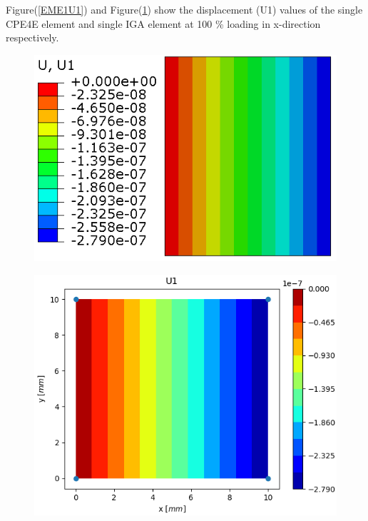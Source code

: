 \documentclass[11pt]{article}
\begin{document}
Figure(\ref{EME1U1}) and Figure(\ref{EME1U1_IGA}) show the displacement (U1) values of the single CPE4E element and single IGA element at 100 \% loading in x-direction respectively. \\
\begin{figure}[H]
	\centering
	\begin{minipage}{.5\textwidth}
		\centering
		\includegraphics[width=1\linewidth]{EME1U1.png}
		\label{EME1U1}
	\end{minipage}%
	\begin{minipage}{.5\textwidth}
		\centering
		\includegraphics[width=1\linewidth]{EME1U1_IGA.png}
		\label{EME1U1_IGA}
	\end{minipage}
\end{figure}
\end{document}
